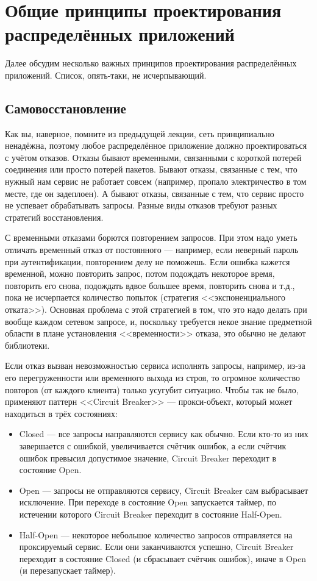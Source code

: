 \documentclass[a5paper]{article}
\begin{document}
\section{Общие принципы проектирования распределённых приложений}

Далее обсудим несколько важных принципов проектирования распределённых приложений. Список, опять-таки, не исчерпывающий.

\subsection{Самовосстановление}

Как вы, наверное, помните из предыдущей лекции, сеть принципиально ненадёжна, поэтому любое распределённое приложение должно проектироваться с учётом отказов. Отказы бывают временными, связанными с короткой потерей соединения или просто потерей пакетов. Бывают отказы, связанные с тем, что нужный нам сервис не работает совсем (например, пропало электричество в том месте, где он задеплоен). А бывают отказы, связанные с тем, что сервис просто не успевает обрабатывать запросы. Разные виды отказов требуют разных стратегий восстановления.

С временными отказами борются повторением запросов. При этом надо уметь отличать временный отказ от постоянного --- например, если неверный пароль при аутентификации, повторением делу не поможешь. Если ошибка кажется временной, можно повторить запрос, потом подождать некоторое время, повторить его снова, подождать вдвое большее время, повторить снова и т.д., пока не исчерпается количество попыток (стратегия <<экспоненциального отката>>). Основная проблема с этой стратегией в том, что это надо делать при вообще каждом сетевом запросе, и, поскольку требуется некое знание предметной области в плане установления <<временности>> отказа, это обычно не делают библиотеки.

Если отказ вызван невозможностью сервиса исполнять запросы, например, из-за его перегруженности или временного выхода из строя, то огромное количество повторов (от каждого клиента) только усугубит ситуацию. Чтобы так не было, применяют паттерн <<Circuit Breaker>> --- прокси-объект, который может находиться в трёх состояниях:

\begin{itemize}
    \item Closed --- все запросы направляются сервису как обычно. Если кто-то из них завершается с ошибкой, увеличивается счётчик ошибок, а если счётчик ошибок превысил допустимое значение, Circuit Breaker переходит в состояние Open.
    \item Open --- запросы не отправляются сервису, Circuit Breaker сам выбрасывает исключение. При переходе в состояние Open запускается таймер, по истечении которого Circuit Breaker переходит в состояние Half-Open.
    \item Half-Open --- некоторое небольшое количество запросов отправляется на проксируемый сервис. Если они заканчиваются успешно, Circuit Breaker переходит в состояние Closed (и сбрасывает счётчик ошибок), иначе в Open (и перезапускает таймер).
\end{itemize}
\end{document}
